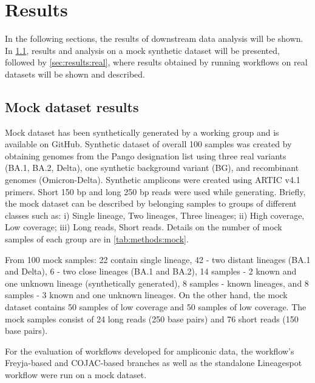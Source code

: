 %
\section{Results} \label{sec:results}
In the following sections, the results of downstream data analysis will be shown. In \cref{sec:results:mock}, results and analysis on a mock synthetic dataset will be presented, followed by \cref{sec:results:real}, where results obtained by running workflows on real datasets will be shown and described.

    \subsection{Mock dataset results} \label{sec:results:mock}
    Mock dataset has been synthetically generated by a working group and is available on GitHub. Synthetic dataset of overall 100 samples was created by obtaining genomes from the Pango designation list using three real variants (BA.1, BA.2, Delta), one synthetic background variant (BG), and recombinant genomes (Omicron-Delta). Synthetic amplicons were created using ARTIC v4.1 primers. Short 150 bp and long 250 bp reads were used while generating. Briefly, the mock dataset can be described by belonging samples to groups of different classes such as: i) Single lineage, Two lineages, Three lineages; ii) High coverage, Low coverage; iii) Long reads, Short reads. Details on the number of mock samples of each group are in \cref{tab:methods:mock}.
    
    From 100 mock samples: 22 contain single lineage, 42 - two distant lineages (BA.1 and Delta), 6 - two close lineages (BA.1 and BA.2), 14 samples - 2 known and one unknown lineage (synthetically generated), 8 samples - known lineages, and 8 samples - 3 known and one unknown lineages. On the other hand, the mock dataset contains 50 samples of low coverage and 50 samples of low coverage. The mock samples consist of 24 long reads (250 base pairs) and 76 short reads (150 base pairs).
    
    For the evaluation of workflows developed for ampliconic data, the workflow’s Freyja-based and COJAC-based branches as well as the standalone Lineagespot workflow were run on a mock dataset.
    
